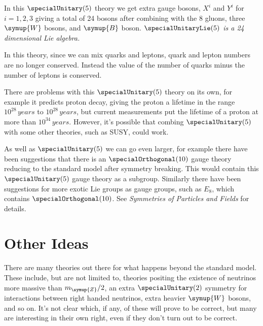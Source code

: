 \documentclass[fleqn]{NotesClass}
\newcommand{\Pparticle}[1]{\symup{#1}}
\newcommand{\PZ}{\ensuremath{\Pparticle{Z}}}
\newcommand{\PW}{\ensuremath{\Pparticle{W}}}
\newcommand{\course}[1]{\textit{#1}}
\begin{document}
    In this \(\specialUnitary(5)\) theory we get extra gauge bosons, \(X^i\) and \(Y^i\) for \(i = 1, 2, 3\) giving a total of 24 bosons after combining with the 8 gluons, three \PW{} bosons, and \(\Pparticle{B}\) boson.
    \textit{\(\specialUnitaryLie(5)\) is a 24 dimensional Lie algebra.}
    
    In this theory, since we can mix quarks and leptons, quark and lepton numbers are no longer conserved.
    Instead the value of the number of quarks minus the number of leptons is conserved.
    
    There are problems with this \(\specialUnitary(5)\) theory on its own, for example it predicts proton decay, giving the proton a lifetime in the range \(10^28\,\unit{years}\) to \(10^28\,\unit{years}\), but current measurements put the lifetime of a proton at more than \(10^{34} \, \unit{years}\).
    However, it's possible that combing \(\specialUnitary(5)\) with some other theories, such as SUSY, could work.
    
    As well as \(\specialUnitary(5)\) we can go even larger, for example there have been suggestions that there is an \(\specialOrthogonal(10)\) gauge theory reducing to the standard model after symmetry breaking.
    This would contain this \(\specialUnitary(5)\) gauge theory as a subgroup.
    Similarly there have been suggestions for more exotic Lie groups as gauge groups, such as \(E_8\), which contains \(\specialOrthogonal(10)\).
    See \course{Symmetries of Particles and Fields} for details.
    
    \section{Other Ideas}
    There are many theories out there for what happens beyond the standard model.
    These include, but are not limited to, theories positing the existence of neutrinos more massive than \(m_{\PZ}/2\), an extra \(\specialUnitary(2)\) symmetry for interactions between right handed neutrinos, extra heavier \PW{} bosons, and so on.
    It's not clear which, if any, of these will prove to be correct, but many are interesting in their own right, even if they don't turn out to be correct.
    
    \appendixpage
    \begin{appendices}
        
        
        
        
    \end{appendices}
    
\end{document}
